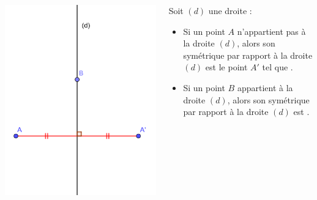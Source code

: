 \documentclass[xcolor={dvipsnames}]{beamer}
\begin{document}
\begin{frame}
	
	\begin{columns}
		\begin{column}{0.35\textwidth}
				\includegraphics[scale=0.18]{def}
		\end{column}
	
		\begin{column}{0.65\textwidth}
			\begin{myprops}
				Soit $(d)$ une droite :
				\begin{itemize}
					\item Si un point $A$ n'appartient pas à la droite $(d)$, alors son symétrique par rapport à la droite $(d)$ est le point $A'$ tel que .
					\item Si un point $B$ appartient à la droite $(d)$, alors son symétrique par rapport à la droite $(d)$ est .
				\end{itemize}
			\end{myprops}
		\end{column}
	\end{columns}
	
	
\end{frame}
\end{document}
